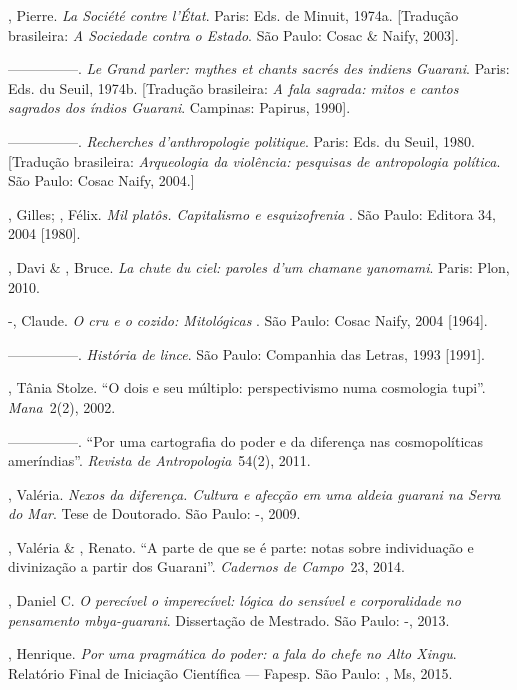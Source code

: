{{\begin{Parskip}
, Pierre. \emph{La Société contre l’État}. Paris: Eds. de Minuit,
1974a. [Tradução brasileira: \emph{A Sociedade contra o Estado}. São Paulo:
Cosac \& Naify, 2003].

—————. \emph{Le Grand parler: mythes et chants sacrés des indiens Guarani}.
Paris: Eds. du Seuil, 1974b. [Tradução brasileira: \emph{A fala sagrada:
mitos e cantos sagrados dos índios Guarani}. Campinas: Papirus, 1990]. 

—————. \emph{Recherches d’anthropologie politique}. Paris: Eds. du Seuil, 1980.
[Tradução brasileira: \emph{Arqueologia da violência: pesquisas de
antropologia política}. São Paulo: Cosac Naify, 2004.] 

, Gilles; , Félix. \emph{Mil platôs. Capitalismo e
esquizofrenia }. São Paulo: Editora 34, 2004 [1980].

, Davi \& , Bruce. \emph{La chute du ciel: paroles d’um chamane
yanomami}. Paris: Plon, 2010.

-, Claude. \emph{O cru e o cozido: Mitológicas }. São Paulo: Cosac
Naify, 2004 [1964].

—————. \emph{História de lince}. São Paulo: Companhia das Letras, 1993 [1991]. 

, Tânia Stolze. ``O dois e seu múltiplo: perspectivismo numa
cosmologia tupi''. \emph{Mana}~2(2), 2002.

—————. ``Por uma cartografia do poder e da diferença nas cosmopolíticas
ameríndias''. \emph{Revista de Antropologia}~54(2), 2011. 

, Valéria. \emph{Nexos da diferença. Cultura e afecção em uma aldeia
guarani na Serra do Mar}. Tese de Doutorado. São Paulo: -, 2009.

, Valéria \& , Renato. ``A parte de que se é parte: notas
sobre individuação e divinização a partir dos Guarani''. \emph{Cadernos de
Campo}~23, 2014.

, Daniel C. \emph{O perecível o imperecível: lógica do sensível e
corporalidade no pensamento mbya-guarani}. Dissertação de Mestrado. São
Paulo: -, 2013.

, Henrique. \emph{Por uma pragmática do poder: a fala do chefe no Alto
Xingu}. Relatório Final de Iniciação Científica --- Fapesp. São Paulo:
, Ms, 2015. 


\end{Parskip}}}
